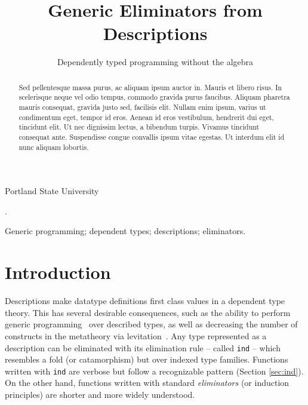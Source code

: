 \documentclass[preprint,nonatbib]{sigplanconf}
\begin{document}
\setlength{\pdfpageheight}{\paperheight}
\setlength{\pdfpagewidth}{\paperwidth}


\title{Generic Eliminators from Descriptions}
\subtitle{Dependently typed programming without the algebra}

           {Portland State University}

\maketitle

\begin{abstract}
Sed pellentesque massa purus, ac aliquam ipsum auctor in. Mauris et
libero risus. In scelerisque neque vel odio tempus, commodo gravida
purus faucibus. Aliquam pharetra mauris consequat, gravida justo sed,
facilisis elit. Nullam enim ipsum, varius ut condimentum eget, tempor
id eros. Aenean id eros vestibulum, hendrerit dui eget, tincidunt
elit. Ut nec dignissim lectus, a bibendum turpis. Vivamus tincidunt
consequat ante. Suspendisse congue convallis ipsum vitae egestas. Ut
interdum elit id nunc aliquam lobortis.
\end{abstract}

.

\keywords
Generic programming; dependent types; descriptions; eliminators.

\section{Introduction}
\label{sec:intro}

Descriptions make datatype definitions first class values in a
dependent type theory. This has several desirable consequences, such as the
ability to perform generic programming~\citep{Chapman:2010:GAL:1932681.1863547,mcbride2010ornamental,dagand:phd}
over described types, as well as decreasing the number of constructs in the
metatheory via levitation~\citep{Chapman:2010:GAL:1932681.1863547,dagand:phd}. 
Any type represented as a description can
be eliminated with its elimination rule -- called {\tt ind} -- which resembles a fold (or catamorphism) but
over indexed type families. Functions written with {\tt ind} are
verbose but follow a recognizable pattern (Section \ref{sec:ind}). 
On the other hand, functions written with standard {\it eliminators} (or
induction principles) are shorter and more widely understood.
\end{document}
